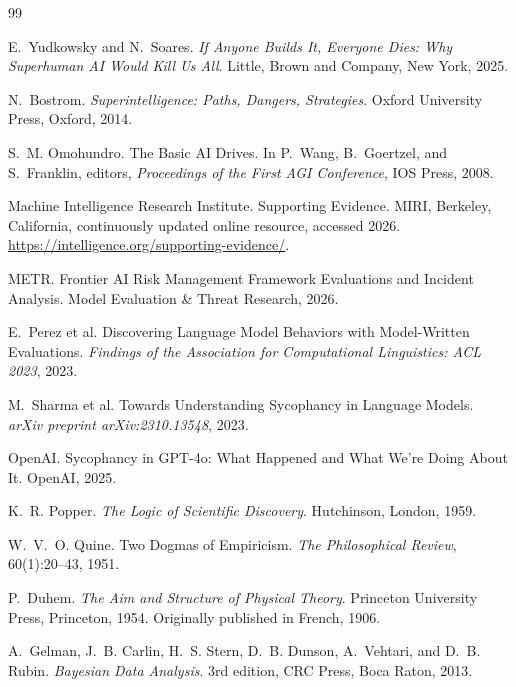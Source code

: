 \documentclass[11pt]{article}
\begin{document}
\begin{thebibliography}{99}

E.~Yudkowsky and N.~Soares.
\newblock \emph{If Anyone Builds It, Everyone Dies: Why Superhuman AI Would Kill Us All}.
\newblock Little, Brown and Company, New York, 2025.

N.~Bostrom.
\newblock \emph{Superintelligence: Paths, Dangers, Strategies}.
\newblock Oxford University Press, Oxford, 2014.

S.~M. Omohundro.
\newblock The Basic AI Drives.
\newblock In P.~Wang, B.~Goertzel, and S.~Franklin, editors,
\emph{Proceedings of the First AGI Conference}, IOS Press, 2008.

Machine Intelligence Research Institute.
\newblock Supporting Evidence.
\newblock MIRI, Berkeley, California, continuously updated online resource,
accessed 2026.
\newblock \url{https://intelligence.org/supporting-evidence/}.

METR.
\newblock Frontier AI Risk Management Framework Evaluations and Incident Analysis.
\newblock Model Evaluation \& Threat Research, 2026.

E.~Perez et al.
\newblock Discovering Language Model Behaviors with Model-Written Evaluations.
\newblock \emph{Findings of the Association for Computational Linguistics:
ACL 2023}, 2023.

M.~Sharma et al.
\newblock Towards Understanding Sycophancy in Language Models.
\newblock \emph{arXiv preprint arXiv:2310.13548}, 2023.

OpenAI.
\newblock Sycophancy in GPT-4o: What Happened and What We're Doing About It.
\newblock OpenAI, 2025.

K.~R. Popper.
\newblock \emph{The Logic of Scientific Discovery}.
\newblock Hutchinson, London, 1959.

W.~V.~O. Quine.
\newblock Two Dogmas of Empiricism.
\newblock \emph{The Philosophical Review}, 60(1):20--43, 1951.

P.~Duhem.
\newblock \emph{The Aim and Structure of Physical Theory}.
\newblock Princeton University Press, Princeton, 1954.
\newblock Originally published in French, 1906.

A.~Gelman, J.~B. Carlin, H.~S. Stern, D.~B. Dunson,
A.~Vehtari, and D.~B. Rubin.
\newblock \emph{Bayesian Data Analysis}.
\newblock 3rd edition, CRC Press, Boca Raton, 2013.

\end{thebibliography}
\end{document}
